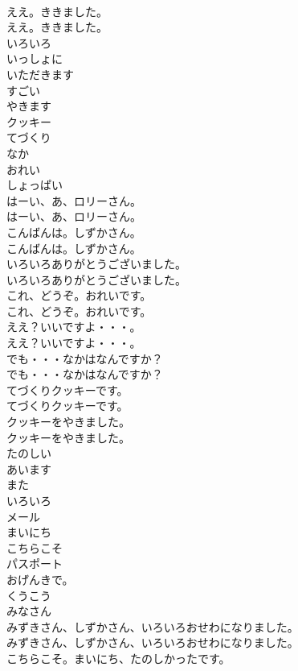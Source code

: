 \documentclass[8pt]{extreport}
\begin{document}
\begin{CJK}{UTF8}{min}
\\	ええ。ききました。	
\\	ええ。ききました。 
\\	いろいろ
\\	いっしょに
\\	いただきます
\\	すごい
\\	やきます
\\	クッキー
\\	てづくり
\\	なか
\\	おれい
\\	しょっぱい
\\	はーい、あ、ロリーさん。	
\\	はーい、あ、ロリーさん。 
\\	こんばんは。しずかさん。	
\\	こんばんは。しずかさん。 
\\	いろいろありがとうございました。	
\\	いろいろありがとうございました。 
\\	これ、どうぞ。おれいです。	
\\	これ、どうぞ。おれいです。 
\\	ええ？いいですよ・・・。	
\\	ええ？いいですよ・・・。 
\\	でも・・・なかはなんですか？	
\\	でも・・・なかはなんですか？ 
\\	てづくりクッキーです。	
\\	てづくりクッキーです。 
\\	クッキーをやきました。	
\\	クッキーをやきました。 
\\	たのしい
\\	あいます
\\	また
\\	いろいろ
\\	メール
\\	まいにち
\\	こちらこそ
\\	パスポート
\\	おげんきで。
\\	くうこう
\\	みなさん
\\	みずきさん、しずかさん、いろいろおせわになりました。	
\\	みずきさん、しずかさん、いろいろおせわになりました。 
\\	こちらこそ。まいにち、たのしかったです。	

\end{CJK}
\end{document}
